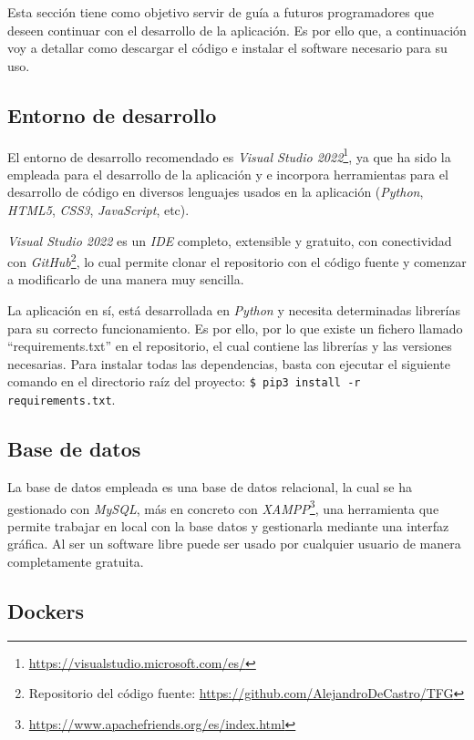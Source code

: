 Esta sección tiene como objetivo servir de guía a futuros programadores que deseen continuar con el desarrollo de la aplicación. Es por ello que, a continuación voy a detallar como descargar el código e instalar el software necesario para su uso.

\subsection{Entorno de desarrollo}

El entorno de desarrollo recomendado es \textit{Visual Studio 2022}\footnote{\url{https://visualstudio.microsoft.com/es/}}, ya que ha sido la empleada para el desarrollo de la aplicación y e incorpora herramientas para el desarrollo de código en diversos lenguajes usados en la aplicación (\textit{Python}, \textit{HTML5}, \textit{CSS3}, \textit{JavaScript}, etc). 

\textit{Visual Studio 2022} es un \textit{IDE} completo, extensible y gratuito, con conectividad con \textit{GitHub}\footnote{Repositorio del código fuente: \url{https://github.com/AlejandroDeCastro/TFG}}, lo cual permite clonar el repositorio con el código fuente y comenzar a modificarlo de una manera muy sencilla.

La aplicación en sí, está desarrollada en \textit{Python} y necesita determinadas librerías para su correcto funcionamiento. Es por ello, por lo que existe un fichero llamado ``requirements.txt'' en el repositorio, el cual contiene las librerías y las versiones necesarias. Para instalar todas las dependencias, basta con ejecutar el siguiente comando en el directorio raíz del proyecto: \texttt{\$ pip3 install -r requirements.txt}.

\subsection{Base de datos}

La base de datos empleada es una base de datos relacional, la cual se ha gestionado con \textit{MySQL}, más en concreto con \textit{XAMPP}\footnote{\url{https://www.apachefriends.org/es/index.html}}, una herramienta que permite trabajar en local con la base datos y gestionarla mediante una interfaz gráfica. Al ser un software libre puede ser usado por cualquier usuario de manera completamente gratuita.

\subsection{Dockers}

